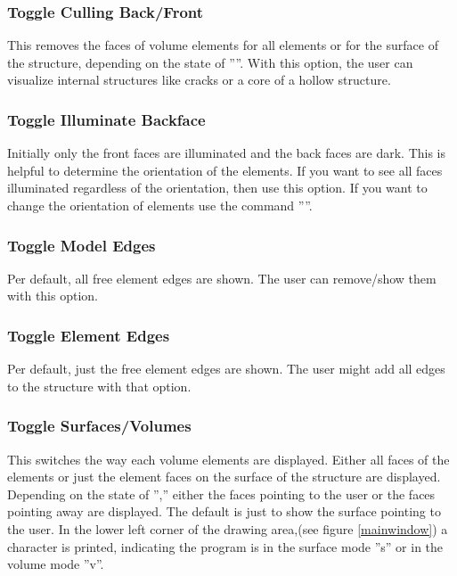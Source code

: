 \documentclass{article}
\begin{document}
\subsubsection{\label{Toggle Culling Back/Front}Toggle Culling Back/Front}
This removes the faces of volume elements for all elements or for the surface of the structure, depending on the state of ''''. With this option, the user can visualize internal structures like cracks or a core of a hollow structure.

\subsubsection{\label{Toggle Illuminate Backface}Toggle Illuminate Backface}
Initially only the front faces are illuminated and the back faces are dark. This is helpful to determine the orientation of the elements. If you want to see all faces illuminated regardless of the orientation, then use this option. If you want to change the orientation of elements use the command ''''.

\subsubsection{\label{Toggle Model Edges}Toggle Model Edges}
Per default, all free element edges are shown. The user can remove/show them with this option.

\subsubsection{\label{Toggle Element Edges}Toggle Element Edges}
Per default, just the free element edges are shown. The user might add all edges to the structure with that option.

\subsubsection{\label{Toggle Surfaces/Volumes}Toggle Surfaces/Volumes}
This switches the way each volume elements are displayed. Either all faces of the elements or just the element faces on the surface of the structure are displayed. Depending on the state of '','' either the faces pointing to the user or the faces pointing away are displayed. The default is just to show the surface pointing to the user. In the lower left corner of the drawing area,(see figure \ref{mainwindow}) a character is printed, indicating the program is in the surface mode ''s'' or in the volume mode ''v''.
\end{document}
